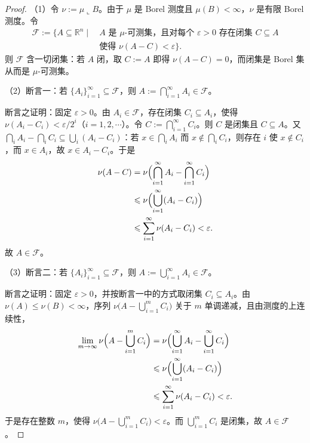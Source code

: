 \documentclass[../../main.tex]{subfiles}
\begin{document}
\begin{proof}
（1）令 $\nu:=\mu\llcorner B$。由于 $\mu$ 是 Borel 测度且 $\mu(B)<\infty$，$\nu$ 是有限 Borel 测度。令
\begin{align*}
\mathcal{F}:=\{A\subseteq\mathbb{R}^{n}\mid\ &A\text{ 是 }\mu\text{-可测集，且对每个 }\varepsilon>0\text{ 存在闭集 }C\subseteq A\\
&\text{使得 }\nu(A-C)<\varepsilon\}.
\end{align*}
则 $\mathcal{F}$ 含一切闭集：若 $A$ 闭，取 $C:=A$ 即得 $\nu(A-C)=0$，而闭集是 Borel 集从而是 $\mu$-可测集。

（2）断言一：若 $\{A_{i}\}_{i=1}^{\infty}\subseteq\mathcal{F}$，则 $A:=\bigcap_{i=1}^{\infty}A_{i}\in\mathcal{F}$。

断言之证明：固定 $\varepsilon>0$。由 $A_{i}\in\mathcal{F}$，存在闭集 $C_{i}\subseteq A_{i}$，使得 $\nu(A_{i}-C_{i})<\varepsilon/2^{i}$（$i=1,2,\cdots$）。令 $C:=\bigcap_{i=1}^{\infty}C_{i}$。则 $C$ 是闭集且 $C\subseteq A$。又 $\bigcap_{i}A_{i}-\bigcap_{i}C_{i}\subseteq\bigcup_{i}(A_{i}-C_{i})$：若 $x\in\bigcap_{i}A_{i}$ 而 $x\notin\bigcap_{i}C_{i}$，则存在 $i$ 使 $x\notin C_{i}$，而 $x\in A_{i}$，故 $x\in A_{i}-C_{i}$。于是
\begin{align*}
\nu(A-C)&=\nu\Bigl(\bigcap_{i=1}^{\infty}A_{i}-\bigcap_{i=1}^{\infty}C_{i}\Bigr)\\
&\leqslant\nu\Bigl(\bigcup_{i=1}^{\infty}(A_{i}-C_{i})\Bigr)\\
&\leqslant\sum_{i=1}^{\infty}\nu(A_{i}-C_{i})<\varepsilon.
\end{align*}
故 $A\in\mathcal{F}$。

（3）断言二：若 $\{A_{i}\}_{i=1}^{\infty}\subseteq\mathcal{F}$，则 $A:=\bigcup_{i=1}^{\infty}A_{i}\in\mathcal{F}$。

断言之证明：固定 $\varepsilon>0$，并按断言一中的方式取闭集 $C_{i}\subseteq A_{i}$。由 $\nu(A)\leqslant\nu(B)<\infty$，序列 $\nu\bigl(A-\bigcup_{i=1}^{m}C_{i}\bigr)$ 关于 $m$ 单调递减，且由测度的上连续性，
\begin{align*}
\lim_{m\to\infty}\nu\Bigl(A-\bigcup_{i=1}^{m}C_{i}\Bigr)&=\nu\Bigl(\bigcup_{i=1}^{\infty}A_{i}-\bigcup_{i=1}^{\infty}C_{i}\Bigr)\\
&\leqslant\nu\Bigl(\bigcup_{i=1}^{\infty}(A_{i}-C_{i})\Bigr)\\
&\leqslant\sum_{i=1}^{\infty}\nu(A_{i}-C_{i})<\varepsilon.
\end{align*}
于是存在整数 $m$，使得 $\nu\bigl(A-\bigcup_{i=1}^{m}C_{i}\bigr)<\varepsilon$。而 $\bigcup_{i=1}^{m}C_{i}$ 是闭集，故 $A\in\mathcal{F}$。


\end{proof}
\end{document}
